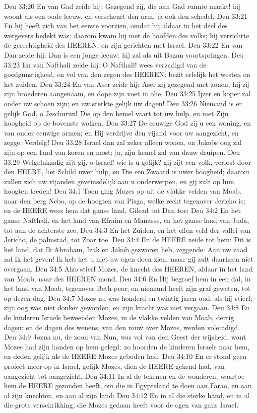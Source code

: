 Deu 33:20  En van Gad zeide hij: Gezegend zij, die aan Gad ruimte maakt! hij woont als een oude leeuw, en verscheurt den arm, ja ook den schedel.
Deu 33:21  En hij heeft zich van het eerste voorzien, omdat hij aldaar in het deel des wetgevers bedekt was; daarom kwam hij met de hoofden des volks; hij verrichtte de gerechtigheid des HEEREN, en zijn gerichten met Israel.
Deu 33:22  En van Dan zeide hij: Dan is een jonge leeuw; hij zal als uit Bazan voortspringen.
Deu 33:23  En van Nafthali zeide hij: O Nafthali! wees verzadigd van de goedgunstigheid, en vol van den zegen des HEEREN; bezit erfelijk het westen en het zuiden.
Deu 33:24  En van Aser zeide hij: Aser zij gezegend met zonen; hij zij zijn broederen aangenaam, en dope zijn voet in olie.
Deu 33:25  Ijzer en koper zal onder uw schoen zijn; en uw sterkte gelijk uw dagen!
Deu 33:26  Niemand is er gelijk God, o Jeschurun! Die op den hemel vaart tot uw hulp, en met Zijn hoogheid op de bovenste wolken.
Deu 33:27  De eeuwige God zij u een woning, en van onder eeuwige armen; en Hij verdrijve den vijand voor uw aangezicht, en zegge: Verdelg!
Deu 33:28  Israel dan zal zeker alleen wonen, en Jakobs oog zal zijn op een land van koren en most; ja, zijn hemel zal van dauw druipen.
Deu 33:29  Welgelukzalig zijt gij, o Israel! wie is u gelijk? gij zijt een volk, verlost door den HEERE, het Schild uwer hulp, en Die een Zwaard is uwer hoogheid; daarom zullen zich uw vijanden geveinsdelijk aan u onderwerpen, en gij zult op hun hoogten treden!
Deu 34:1  Toen ging Mozes op uit de vlakke velden van Moab, naar den berg Nebo, op de hoogten van Pisga, welke recht tegenover Jericho is; en de HEERE wees hem dat ganse land, Gilead tot Dan toe;
Deu 34:2  En het ganse Nafthali, en het land van Efraim en Manasse, en het ganse land van Juda, tot aan de achterste zee;
Deu 34:3  En het Zuiden, en het effen veld der vallei van Jericho, de palmstad, tot Zoar toe.
Deu 34:4  En de HEERE zeide tot hem: Dit is het land, dat Ik Abraham, Izak en Jakob gezworen heb, zeggende: Aan uw zaad zal Ik het geven! Ik heb het u met uw ogen doen zien, maar gij zult daarheen niet overgaan.
Deu 34:5  Alzo stierf Mozes, de knecht des HEEREN, aldaar in het land van Moab, naar des HEEREN mond.
Deu 34:6  En Hij begroef hem in een dal, in het land van Moab, tegenover Beth-peor; en niemand heeft zijn graf geweten, tot op dezen dag.
Deu 34:7  Mozes nu was honderd en twintig jaren oud, als hij stierf; zijn oog was niet donker geworden, en zijn kracht was niet vergaan.
Deu 34:8  En de kinderen Israels beweenden Mozes, in de vlakke velden van Moab, dertig dagen; en de dagen des wenens, van den rouw over Mozes, werden voleindigd.
Deu 34:9  Jozua nu, de zoon van Nun, was vol van den Geest der wijsheid; want Mozes had zijn handen op hem gelegd; zo hoorden de kinderen Israels naar hem, en deden gelijk als de HEERE Mozes geboden had.
Deu 34:10  En er stond geen profeet meer op in Israel, gelijk Mozes, dien de HEERE gekend had, van aangezicht tot aangezicht,
Deu 34:11  In al de tekenen en de wonderen, waartoe hem de HEERE gezonden heeft, om die in Egypteland te doen aan Farao, en aan al zijn knechten, en aan al zijn land;
Deu 34:12  En in al die sterke hand, en in al die grote verschrikking, die Mozes gedaan heeft voor de ogen van gans Israel.




